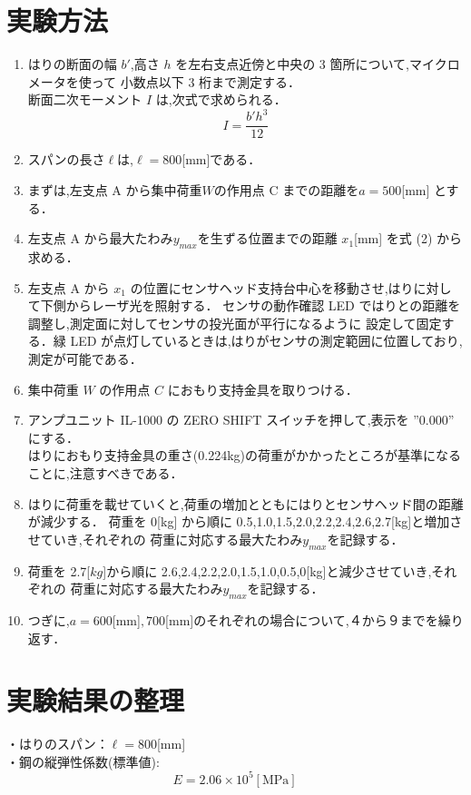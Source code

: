 \documentclass[a4paper,12pt]{jsarticle}
\begin{document}
\section{実験方法}
\begin{enumerate}
  \item はりの断面の幅 $b'$,高さ $h$ を左右支点近傍と中央の 3 箇所について,マイクロメータを使って
  小数点以下 3 桁まで測定する．\\
  \quad 断面二次モーメント $I$ は,次式で求められる．
  \begin{equation}
    I = {\dfrac{b'h^3}{12}}
  \end{equation}
  \item スパンの長さ$ \ell $は,$\ell= 800$[mm]である．
  \item まずは,左支点 A から集中荷重$ W $の作用点 C までの距離を$a = 500$[mm] とする．
  \item 左支点 A から最大たわみ$y_{max}$を生ずる位置までの距離 $x_1$[mm] を式 (2) から求める．
  \item 左支点 A から $x_1$ の位置にセンサヘッド支持台中心を移動させ,はりに対して下側からレーザ光を照射する．
  センサの動作確認 LED ではりとの距離を調整し,測定面に対してセンサの投光面が平行になるように
  設定して固定する．緑 LED が点灯しているときは,はりがセンサの測定範囲に位置しており,測定が可能である．
  \item  集中荷重 $W$ の作用点 $C$ におもり支持金具を取りつける．
  \item アンプユニット IL-1000 の ZERO SHIFT スイッチを押して,表示を ”0.000” にする．\\
  はりにおもり支持金具の重さ(0.224kg)の荷重がかかったところが基準になることに,注意すべきである．
  \item はりに荷重を載せていくと,荷重の増加とともにはりとセンサヘッド間の距離が減少する．
  荷重を 0[kg] から順に 0.5,1.0,1.5,2.0,2.2,2.4,2.6,2.7[kg]と増加させていき,それぞれの
  荷重に対応する最大たわみ$y_{max}$を記録する．
  \item 荷重を 2.7[$kg$]から順に 2.6,2.4,2.2,2.0,1.5,1.0,0.5,0[kg]と減少させていき,それぞれの
  荷重に対応する最大たわみ$y_{max}$を記録する．
  \item つぎに,$a= 600$[mm]$,700$[mm]のそれぞれの場合について,４から９までを繰り返す．
\end{enumerate}

\section{実験結果の整理}
・はりのスパン：$\ell= 800$[mm]\\
\quad・鋼の縦弾性係数(標準値):
\begin{equation} 
  E = 2.06 \times 10^5 [\text{MPa}]
\end{equation}
\end{document}
